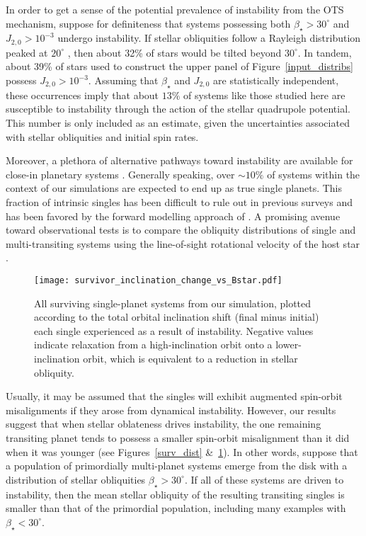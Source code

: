 \documentclass[twocolumn]{aastex63}
\begin{document}
In order to get a sense of the potential prevalence of instability from the OTS mechanism, suppose for definiteness that systems possessing both $\beta_\star>30^\circ$ and $J_{2,0}>10^{-3}$ undergo instability. If stellar obliquities follow a Rayleigh distribution peaked at $20^{\circ}$ \citep{winn2017constraints}, then about 32\% of stars would be tilted beyond $30^\circ$. In tandem, about 39\% of stars used to construct the upper panel of Figure~\ref{input_distribs} possess $J_{2,0}>10^{-3}$. Assuming that $\beta_\star$ and $J_{2,0}$ are statistically independent, these occurrences imply that about $13\%$ of systems like those studied here are susceptible to instability through the action of the stellar quadrupole potential. This number is only included as an estimate, given the uncertainties associated with stellar obliquities and initial spin rates. 

Moreover, a plethora of alternative pathways toward instability are available for close-in planetary systems \citep{chambers1996stability,ford2008origins,batygin2011instability,johansen2012can,petit2020path,pichierri2020onset,tamayo2020predicting}. Generally speaking, over $\sim 10\%$ of systems within the context of our simulations are expected to end up as true single planets. This fraction of intrinsic singles has been difficult to rule out in previous surveys \citep{sanchis2014study} and has been favored by the forward modelling approach of \citet{he2020architecturesb}. A promising avenue toward observational tests is to compare the obliquity distributions of single and multi-transiting systems using the line-of-sight rotational velocity of the host star \citep{morton2014obliquities,winn2017constraints}. 

\begin{figure}
\centering
\texttt{[image: survivor\_inclination\_change\_vs\_Bstar.pdf]}
\caption{
All surviving single-planet systems from our simulation, plotted according to the total orbital inclination shift (final minus initial) each single experienced as a result of instability. Negative values indicate relaxation from a high-inclination orbit onto a lower-inclination orbit, which is equivalent to a reduction in stellar obliquity.}\label{surv_change}
\end{figure}

Usually, it may be assumed that the singles will exhibit augmented spin-orbit misalignments if they arose from dynamical instability. However, our results suggest that when stellar oblateness drives instability, the one remaining transiting planet tends to possess a smaller spin-orbit misalignment than it did when it was younger (see Figures~\ref{surv_dist} \&~\ref{surv_change}). In other words, suppose that a population of primordially multi-planet systems emerge from the disk with a distribution of stellar obliquities $\beta_\star>30^\circ$. If all of these systems are driven to instability, then the mean stellar obliquity of the resulting transiting singles is smaller than that of the primordial population, including many examples with $\beta_\star<30^\circ$.
\end{document}

